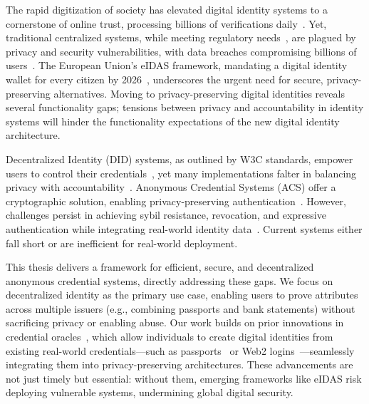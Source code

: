 
The rapid digitization of society has elevated digital identity systems to a cornerstone of online trust, processing billions of verifications daily~\cite{noauthor_happy_2021, pang_zanzibar_2019}. Yet, traditional centralized systems, while meeting regulatory needs~\cite{eltayeb_crucial_2024}, are plagued by privacy and security vulnerabilities, with data breaches compromising billions of users~\cite{zhang_data_2022}. The European Union’s eIDAS framework, mandating a digital identity wallet for every citizen by 2026~\cite{noauthor_regulation_2024}, underscores the urgent need for secure, privacy-preserving alternatives. Moving to privacy-preserving digital identities reveals several functionality gaps; tensions between privacy and accountability in identity systems will hinder the functionality expectations of the new digital identity architecture. 

Decentralized Identity (DID) systems, as outlined by W3C standards, empower users to control their credentials~\cite{soltani_survey_2021}, yet many implementations falter in balancing privacy with accountability~\cite{maram_candid_2020}. Anonymous Credential Systems (ACS) offer a cryptographic solution, enabling privacy-preserving authentication~\cite{chaum_untraceable_1981, hutchison_signature_2004, dunkelman_formal_2016, security_team_computer_science_dept_ibm_zurich_cryptographic_2010}. However, challenges persist in achieving sybil resistance, revocation, and expressive authentication while integrating real-world identity data~\cite{crites_syra_2024, rosenberg_zk-creds_2022}. Current systems either fall short or are inefficient for real-world deployment. 

This thesis delivers a framework for efficient, secure, and decentralized anonymous credential systems, directly addressing these gaps. We focus on decentralized identity as the primary use case, enabling users to prove attributes across multiple issuers (e.g., combining passports and bank statements) without sacrificing privacy or enabling abuse. Our work builds on prior innovations in credential oracles~\cite{zhang_deco_2020}, which allow individuals to create digital identities from existing real-world credentials—such as passports~\cite{rosenberg_zk-creds_2022} or Web2 logins~\cite{baldimtsi_zklogin_2024}—seamlessly integrating them into privacy-preserving architectures. These advancements are not just timely but essential: without them, emerging frameworks like eIDAS risk deploying vulnerable systems, undermining global digital security.

